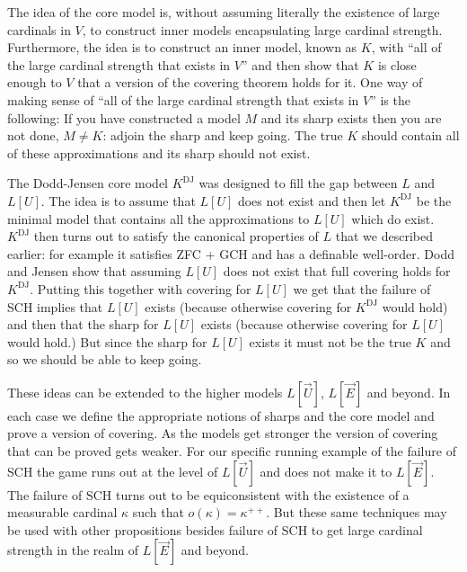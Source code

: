 \documentclass[oneside,12pt]{amsart}
\begin{document}
The idea of the core model is, without assuming literally the existence of
large cardinals in $V$, to
construct inner models encapsulating large cardinal strength. Furthermore, the
idea is to construct an inner model, known as $K$, with ``all of the large cardinal strength
that exists in $V$'' and then show that $K$ is close enough to $V$ that
a version of the covering theorem holds for it. One way of making sense
of ``all of the large cardinal strength that exists in $V$'' is the following:
If you have constructed a model $M$ and its sharp exists then you are not done,
$M\not=K$:
adjoin the sharp and keep going. The true $K$ should contain all of
these approximations and its sharp should not exist.

The Dodd-Jensen core model $K^{\text{DJ}}$ was designed to fill the gap between $L$ and
$L[U]$. The idea is to assume that $L[U]$ does not exist and then let $K^{\text{DJ}}$
be the minimal model that contains all the approximations to $L[U]$ which do exist.
$K^{\text{DJ}}$ then turns out to satisfy the canonical properties of $L$ that
we described earlier: for example it satisfies ZFC + GCH and has a definable well-order.
Dodd and Jensen show that assuming $L[U]$ does not exist that full covering
holds for $K^{\text{DJ}}$. Putting this together with covering for $L[U]$
we get that the failure of SCH implies
that $L[U]$ exists (because otherwise covering for  $K^{\text{DJ}}$ would
hold) and then that the sharp for $L[U]$ exists (because otherwise covering
for $L[U]$ would hold.) But since the sharp for $L[U]$ exists it must not
be the true $K$ and so we should be able to keep going.

These ideas can be extended to the higher models $L[\vec{U}]$, $L[\vec{E}]$
and beyond. In each case we define the appropriate notions of sharps and
the core model and prove a version of covering. As the models get stronger
the version of covering that can be proved gets weaker. For our specific
running example of the failure of SCH the game runs out at the level of
$L[\vec{U}]$ and does not make it to $L[\vec{E}]$. The failure of SCH turns
out to be equiconsistent with the existence  of a measurable cardinal $\kappa$
such that $o(\kappa) = \kappa^{++}$. But these same techniques may be used
with other propositions besides failure of SCH to get large cardinal strength in the realm of
$L[\vec{E}]$ and beyond.




\end{document}
